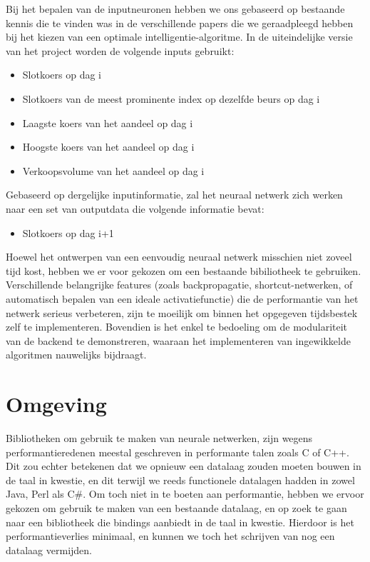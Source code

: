 Bij het bepalen van de inputneuronen hebben we ons gebaseerd op bestaande kennis die te vinden was in de verschillende papers die we geraadpleegd hebben bij het kiezen van een optimale intelligentie-algoritme. In de uiteindelijke versie van het project worden de volgende inputs gebruikt:
\begin{itemize}
\item Slotkoers op dag i
\item Slotkoers van de meest prominente index op dezelfde beurs op dag i
\item Laagste koers van het aandeel op dag i
\item Hoogste koers van het aandeel op dag i
\item Verkoopsvolume van het aandeel op dag i
\end{itemize}
Gebaseerd op dergelijke inputinformatie, zal het neuraal netwerk zich werken naar een set van outputdata die volgende informatie bevat:
\begin{itemize}
\item Slotkoers op dag i+1
\end{itemize}

Hoewel het ontwerpen van een eenvoudig neuraal netwerk misschien niet zoveel tijd kost, hebben we er voor gekozen om een bestaande bibiliotheek te gebruiken. Verschillende belangrijke features (zoals backpropagatie, shortcut-netwerken, of automatisch bepalen van een ideale activatiefunctie) die de performantie van het netwerk serieus verbeteren, zijn te moeilijk om binnen het opgegeven tijdsbestek zelf te implementeren. Bovendien is het enkel te bedoeling om de modulariteit van de backend te demonstreren, waaraan het implementeren van ingewikkelde algoritmen nauwelijks bijdraagt.


\section{Omgeving}

Bibliotheken om gebruik te maken van neurale netwerken, zijn wegens performantieredenen meestal geschreven in performante talen zoals C of C++. Dit zou echter betekenen dat we opnieuw een datalaag zouden moeten bouwen in de taal in kwestie, en dit terwijl we reeds functionele datalagen hadden in zowel Java, Perl als C\#. Om toch niet in te boeten aan performantie, hebben we ervoor gekozen om gebruik te maken van een bestaande datalaag, en op zoek te gaan naar een bibliotheek die bindings aanbiedt in de taal in kwestie. Hierdoor is het performantieverlies minimaal, en kunnen we toch het schrijven van nog een datalaag vermijden.

